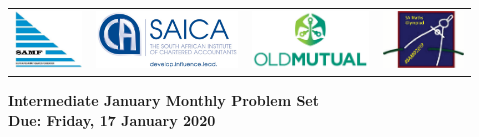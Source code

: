 \documentclass{article}
\begin{document}
\setlength{\tabcolsep}{5pt}
\begin{center} \begin{tabular}{cccc}
	\includegraphics[height=43pt]{SAMF_logo.jpg} &
	\includegraphics[height=43pt]{SAICA_logo.jpg} &
	\includegraphics[height=43pt]{OM_Logo_Stacked_Vignette_on_White_RGB.jpg} &
	\includegraphics[height=43pt]{SAMO2019.png}
\end{tabular} \end{center}

\bigskip

\begin{center}
\textbf{\Large Intermediate January Monthly Problem Set}
\\ \vspace{1em}
\textbf{\large Due: Friday, 17 January 2020}
\end{center}
\end{document}
